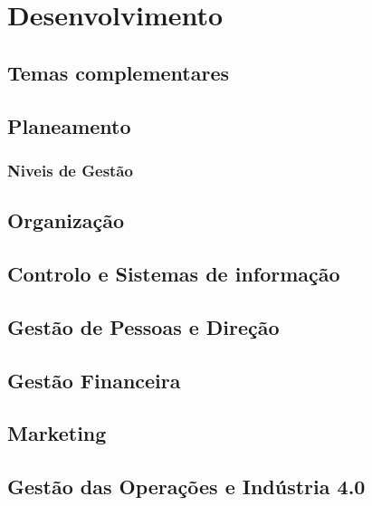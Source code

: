 \chapter{Desenvolvimento}

\section{Temas complementares}

\section{Planeamento}
\subsection{Niveis de Gestão}


\section{Organização}

\section{Controlo e Sistemas de informação}

\section{Gestão de Pessoas e Direção}

\section{Gestão Financeira}

\section{Marketing}

\section{Gestão das Operações e Indústria 4.0}







